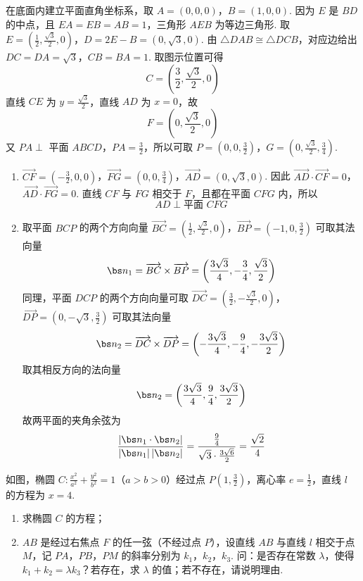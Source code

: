 \begin{solution}
在底面内建立平面直角坐标系，取
\(A=(0,0,0)\)，\(B=(1,0,0)\).
因为 \(E\) 是 \(BD\) 的中点，且 \(EA=EB=AB=1\)，三角形 \(AEB\) 为等边三角形. 取
\(E=\left(\frac12,\frac{\sqrt3}{2},0\right)\)，\(D=2E-B=(0,\sqrt3,0)\).
由 \(\triangle DAB\cong\triangle DCB\)，对应边给出 \(DC=DA=\sqrt3\)，\(CB=BA=1\). 取图示位置可得
\[
C=\left(\frac32,\frac{\sqrt3}{2},0\right)
\]
直线 \(CE\) 为 \(y=\frac{\sqrt3}{2}\)，直线 \(AD\) 为 \(x=0\)，故
\[
F=\left(0,\frac{\sqrt3}{2},0\right)
\]
又 \(PA\perp\) 平面 \(ABCD\)，\(PA=\frac{3}{2}\)，所以可取
\(P=\left(0,0,\frac32\right)\)，\(G=\left(0,\frac{\sqrt3}{2},\frac34\right)\).

\begin{enumerate}
\item
\(\overrightarrow{CF}=\left(-\frac32,0,0\right)\)，\(\overrightarrow{FG}=\left(0,0,\frac34\right)\)，\(\overrightarrow{AD}=(0,\sqrt3,0)\).
因此
\(\overrightarrow{AD}\cdot\overrightarrow{CF}=0\)，\(\overrightarrow{AD}\cdot\overrightarrow{FG}=0\).
直线 \(CF\) 与 \(FG\) 相交于 \(F\)，且都在平面 \(CFG\) 内，所以
\[
AD\perp\text{平面 }CFG
\]

\item 取平面 \(BCP\) 的两个方向向量
\(\overrightarrow{BC}=\left(\frac12,\frac{\sqrt3}{2},0\right)\)，\(\overrightarrow{BP}=\left(-1,0,\frac32\right)\)
可取其法向量
\[
\bs n_1=\overrightarrow{BC}\times\overrightarrow{BP}
=\left(\frac{3\sqrt3}{4},-\frac34,\frac{\sqrt3}{2}\right)
\]
同理，平面 \(DCP\) 的两个方向向量可取
\(\overrightarrow{DC}=\left(\frac32,-\frac{\sqrt3}{2},0\right)\)，\(\overrightarrow{DP}=\left(0,-\sqrt3,\frac32\right)\)
可取其法向量
\[
\bs n_2=\overrightarrow{DC}\times\overrightarrow{DP}
=\left(-\frac{3\sqrt3}{4},-\frac94,-\frac{3\sqrt3}{2}\right)
\]
取其相反方向的法向量
\[
\bs n_2=\left(\frac{3\sqrt3}{4},\frac94,\frac{3\sqrt3}{2}\right)
\]
故两平面的夹角余弦为
\[
\frac{|\bs n_1\cdot\bs n_2|}{|\bs n_1|\,|\bs n_2|}
=\frac{\frac{9}{4}}{\sqrt3\cdot\frac{3\sqrt6}{2}}
=\frac{\sqrt2}{4}
\]
\end{enumerate}
\end{solution}

\begin{problem}
如图，椭圆 \(C: \frac{x^2}{a^2} + \frac{y^2}{b^2} = 1\)（\(a > b > 0\)）经过点 \(P\left(1, \frac{3}{2}\right)\)，离心率 \(e = \frac{1}{2}\)，直线 \(l\) 的方程为 \(x = 4\).

\begin{enumerate}
\item 求椭圆 \(C\) 的方程；
\item \(AB\) 是经过右焦点 \(F\) 的任一弦（不经过点 \(P\)），设直线 \(AB\) 与直线 \(l\) 相交于点 \(M\)，记 \(PA\)，\(PB\)，\(PM\) 的斜率分别为 \(k_{1}\)，\(k_{2}\)，\(k_{3}\). 问：是否存在常数 \(\lambda\)，使得 \(k_{1} + k_{2} = \lambda k_{3}\)？若存在，求 \(\lambda\) 的值；若不存在，请说明理由.
\end{enumerate}

\end{problem}

